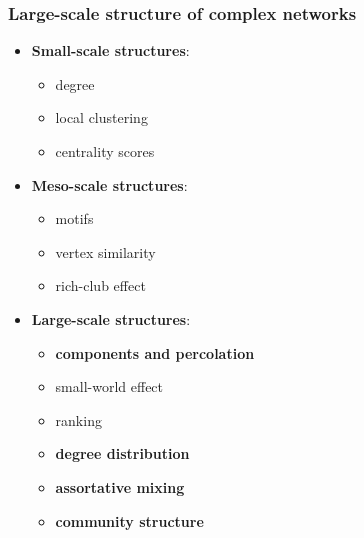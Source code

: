 \documentclass{beamer}
\begin{document}
\begin{frame}
    \frametitle{Large-scale structure of complex networks}
    \begin{itemize}
    \setlength\itemsep{1em}
        \item{{\bf Small-scale structures}: 
            \begin{itemize}
                \item{degree}
                \item{local clustering}
                \item{centrality scores}
            \end{itemize}
}
        \item{{\bf Meso-scale structures}: 
            \begin{itemize}
                \item{motifs}
                \item{vertex similarity}
                \item{rich-club effect}
            \end{itemize}
}
        \item{{\bf Large-scale structures}: 
                \begin{itemize}
                    \item{\bf components and percolation}
                    \item{small-world effect}
                    \item{ranking}
                    \item{{\bf degree distribution}}
                    \item{{\bf assortative mixing}}
                    \item{{\bf community structure}}
                \end{itemize}
}
    \end{itemize}
    
\end{frame}
\end{document}
